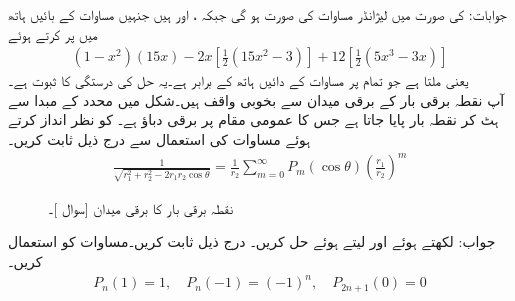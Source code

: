 جوابات: کی صورت میں لیژانڈر مساوات  کی صورت  ہو گی جبکہ
 ،  اور  ہیں جنہیں مساوات کے بائیں ہاتھ میں پر کرتے ہوئے
\begin{align*}
(1-x^2)(15x)-2x[\tfrac{1}{2}(15x^2-3)]+12[\tfrac{1}{2}(5x^3-3x)]
\end{align*}
 یعنی  ملتا ہے جو تمام  پر مساوات کے دائیں ہاتھ کے برابر ہے۔یہ حل کی درستگی کا ثبوت ہے۔
\quad {}\\
آپ نقطہ برقی بار کے برقی میدان سے بخوبی واقف ہیں۔شکل  میں محدد کے مبدا  سے ہٹ کر نقطہ بار  پایا جاتا ہے جس کا عمومی مقام  پر برقی دباؤ
  ہے۔ کو نظر انداز کرتے ہوئے مساوات  کی استعمال سے  درج ذیل ثابت کریں۔
\begin{align}
\frac{1}{\sqrt{r_1^2+r_2^2-2r_1r_2\cos \theta}}=\frac{1}{r_2}\sum_{m=0}^{\infty} P_m(\cos \theta) \left(\frac{r_1}{r_2}\right)^m
\end{align}
%
\begin{figure}
\centering
{}
\caption{نقطہ برقی بار کا برقی میدان [سوال ]۔}
\label{شکل_بیسل_نقطہ_بار_میدان}
\end{figure}
%
جواب: لکھتے ہوئے  اور  لیتے ہوئے حل کریں۔
\quad 
درج ذیل ثابت کریں۔مساوات  کو استعمال کریں۔
\begin{align*}
P_n(1)=1,\quad P_n(-1)=(-1)^n,\quad P_{2n+1}(0)=0
\end{align*}
\\
